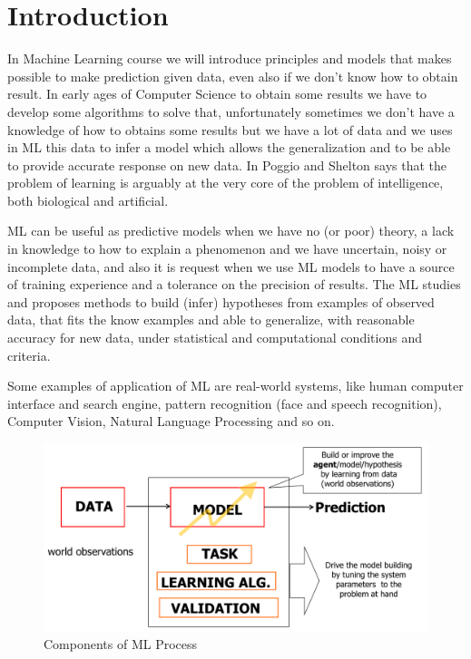 \chapter{Introduction}
In Machine Learning course we will introduce principles and models that makes possible to make prediction
given data, even also if we don't know how to obtain result.\newline
In early ages of Computer Science to obtain some results we have to develop some algorithms to solve that,
unfortunately sometimes we don't have a knowledge of how to obtains some results but we have a lot of data and we 
uses in ML this data to infer a model which allows the generalization and to be able to provide accurate response
on new data.\newline
In \cite{aiMagazine} Poggio and Shelton says that the problem of learning is arguably at the very core of 
the problem of intelligence, both biological and artificial.

ML can be useful as predictive models when we have no (or poor) theory, a lack in knowledge to how to explain
a phenomenon and we have uncertain, noisy or incomplete data, and also it is request when we use ML models 
to have a source of training experience and a tolerance on the precision of results.\newline
The ML studies and proposes methods to build (infer) hypotheses from examples
of observed data, that fits the know examples and able to generalize, with reasonable accuracy for new data,
under statistical and computational conditions and criteria.

Some examples of application of ML are real-world systems, like human computer interface and search engine,
pattern recognition (face and speech recognition), Computer Vision, Natural Language Processing and so on.

\begin{figure}
    \caption{Components of ML Process}
    \label{img:mlProcess}
    \includegraphics[width=\textwidth]{images/mlProcess}
\end{figure}

